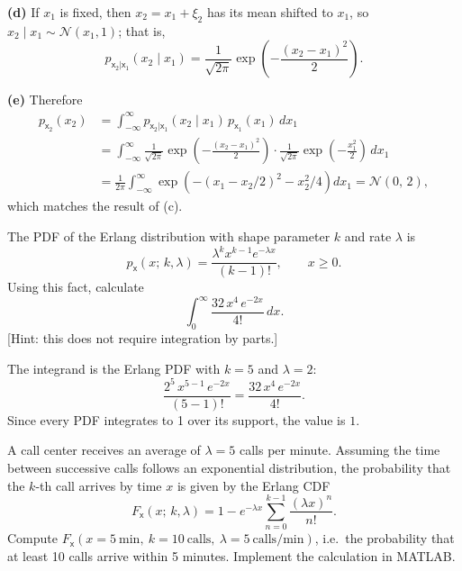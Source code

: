 \begin{solution}
    \textbf{(d)} If $x_{1}$ is fixed, then $x_{2} = x_{1} + \xi_{2}$ has its mean shifted to $x_{1}$, so $x_{2} \mid x_{1} \sim \mathcal{N}(x_{1}, 1)$; that is,
    \[
        p_{\mathsf{x}_{2}|\mathsf{x}_{1}}(x_{2} \mid x_{1})
        = \frac{1}{\sqrt{2\pi}}
          \exp\!\left(-\frac{(x_{2}-x_{1})^{2}}{2}\right).
    \]

    \textbf{(e)} Therefore
    \begin{align*}
        p_{\mathsf{x}_{2}}(x_{2})
        &= \int_{-\infty}^{\infty}
           p_{\mathsf{x}_{2}|\mathsf{x}_{1}}(x_{2} \mid x_{1})\,
           p_{\mathsf{x}_{1}}(x_{1})\, dx_{1} \\
        &= \int_{-\infty}^{\infty}
           \frac{1}{\sqrt{2\pi}}
           \exp\!\left(-\frac{(x_{2}-x_{1})^{2}}{2}\right)
           \cdot
           \frac{1}{\sqrt{2\pi}}
           \exp\!\left(-\frac{x_{1}^{2}}{2}\right)
           \, dx_{1} \\
        &= \frac{1}{2\pi}
           \int_{-\infty}^{\infty}
           \exp\!\left(-(x_{1}-x_{2}/2)^{2} - x_{2}^{2}/4\right)
           dx_{1}
         = \mathcal{N}(0,\,2),
    \end{align*}
    which matches the result of (c).
\end{solution}

\begin{exercise} %
    The PDF of the Erlang distribution with shape parameter $k$ and rate $\lambda$ is
    \[
        p_{\mathsf{x}}(x;\, k, \lambda)
        = \frac{\lambda^{k} x^{k-1} e^{-\lambda x}}{(k-1)!},
        \qquad x \geq 0.
    \]
    Using this fact, calculate
    \[
        \int_{0}^{\infty} \frac{32\, x^{4}\, e^{-2x}}{4!}\, dx.
    \]
    [Hint: this does not require integration by parts.]
\end{exercise}

\begin{solution}
    The integrand is the Erlang PDF with $k = 5$ and $\lambda = 2$:
    \[
        \frac{2^{5}\, x^{5-1}\, e^{-2x}}{(5-1)!}
        = \frac{32\, x^{4}\, e^{-2x}}{4!}.
    \]
    Since every PDF integrates to 1 over its support, the value is $1$.
\end{solution}

\begin{exercise} %
    A call center receives an average of $\lambda = 5$ calls per minute. Assuming the time between successive calls follows an exponential distribution, the probability that the $k$-th call arrives by time $x$ is given by the Erlang CDF
    \[
        F_{\mathsf{x}}(x;\, k, \lambda)
        = 1 - e^{-\lambda x}
          \sum_{n=0}^{k-1} \frac{(\lambda x)^{n}}{n!}.
    \]
    Compute $F_{\mathsf{x}}(x = 5\ \mathrm{min},\ k = 10\ \mathrm{calls},\ \lambda = 5\ \mathrm{calls/min})$, i.e.\ the probability that at least 10 calls arrive within 5 minutes. Implement the calculation in MATLAB.
\end{exercise}

